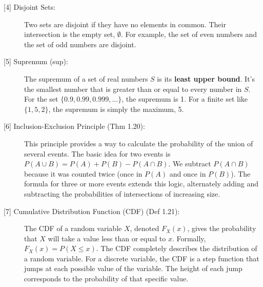 \documentclass[11pt,a4paper]{article}
\begin{document}
\begin{description}
    \item[\hypertarget{note4}{[4] Disjoint Sets:}] Two sets are disjoint if they have no elements in common. Their intersection is the empty set, $\emptyset$. For example, the set of even numbers and the set of odd numbers are disjoint.

    \item[\hypertarget{note5}{[5] Supremum (sup):}] The supremum of a set of real numbers $S$ is its \textbf{least upper bound}. It's the smallest number that is greater than or equal to every number in $S$. For the set $\{0.9, 0.99, 0.999, \dots\}$, the supremum is 1. For a finite set like $\{1, 5, 2\}$, the supremum is simply the maximum, 5.

    \item[\hypertarget{note6}{[6] Inclusion-Exclusion Principle (Thm 1.20):}] This principle provides a way to calculate the probability of the union of several events. The basic idea for two events is $P(A \cup B) = P(A) + P(B) - P(A \cap B)$. We subtract $P(A \cap B)$ because it was counted twice (once in $P(A)$ and once in $P(B)$). The formula for three or more events extends this logic, alternately adding and subtracting the probabilities of intersections of increasing size.

    \item[\hypertarget{note7}{[7] Cumulative Distribution Function (CDF) (Def 1.21):}] The CDF of a random variable $X$, denoted $F_X(x)$, gives the probability that $X$ will take a value less than or equal to $x$. Formally, $F_X(x) = P(X \le x)$. The CDF completely describes the distribution of a random variable. For a discrete variable, the CDF is a step function that jumps at each possible value of the variable. The height of each jump corresponds to the probability of that specific value.
\end{description}
\end{document}
